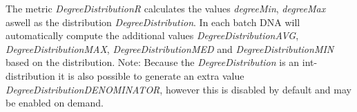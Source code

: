 The metric \textit{DegreeDistributionR} calculates the values \textit{degreeMin}, \textit{degreeMax} aswell as the distribution \textit{DegreeDistribution}. In each batch DNA will automatically compute the additional values \textit{DegreeDistribution\textunderscore AVG}, \textit{DegreeDistribution\textunderscore MAX}, \textit{DegreeDistribution\textunderscore MED} and \textit{DegreeDistribution\textunderscore MIN} based on the distribution. Note: Because the \textit{DegreeDistribution} is an int-distribution it is also possible to generate an extra value \textit{DegreeDistribution\textunderscore DENOMINATOR}, however this is disabled by default and may be enabled on demand.